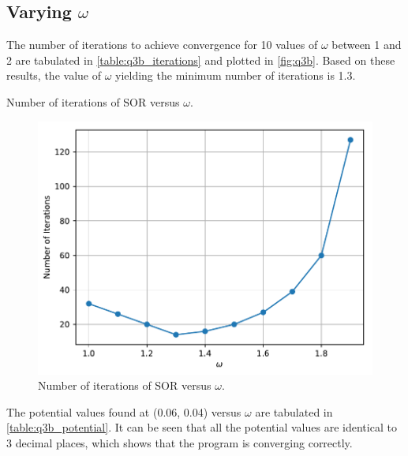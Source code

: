 \documentclass[a4paper,titlepage]{article}
\begin{document}
	\subsection{Varying $\omega$}
	
	The number of iterations to achieve convergence for 10 values of $\omega$ between 1 and 2 are tabulated in \autoref{table:q3b_iterations} and plotted in \autoref{fig:q3b}. Based on these results, the value of $\omega$ yielding the minimum number of iterations is 1.3.
	
	\begin{table}[!htb]
		\centering
		\caption{Number of iterations of SOR versus $\omega$.}
		\label{table:q3b_iterations}
	\end{table}
	
	\begin{figure}[!htb]
		\centering
		\includegraphics[width=\columnwidth]{plots/q3b.pdf}
		\caption
		{Number of iterations of SOR versus $\omega$.}
		\label{fig:q3b}
	\end{figure}

	The potential values found at (0.06, 0.04) versus $\omega$ are tabulated in \autoref{table:q3b_potential}. It can be seen that all the potential values are identical to 3 decimal places, which shows that the program is converging correctly.
\end{document}
